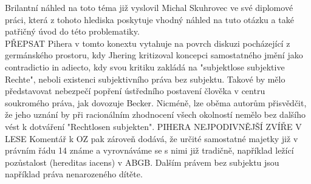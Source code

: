 \documentclass{article}
\begin{document}
Brilantní náhled na toto téma již vyslovil Michal Skuhrovec ve své diplomové práci, která z tohoto hlediska poskytuje vhodný náhled na tuto otázku a také patřičný úvod do této problematiky.\\




PŘEPSAT
Pihera v tomto konextu vytahuje na povrch diskuzi pocházející z germánského prostoru, kdy Jhering kritizoval koncepci samostatného jmění jako contradictio in adiecto, kdy svou kritiku zakládá na "subjektlose subjektive Rechte", neboli existenci subjektivního práva bez subjektu. Takové by mělo představovat nebezpečí popření ústředního postavení člověka v centru soukromého práva, jak dovozuje Becker. Nicméně, lze oběma autorům přisvědčit, že jeho uznání by při racionálním zhodnocení všech okolností nemělo bez dalšího vést k dotváření "Rechtlosen subjekten". PIHERA NEJPODIVNĚJŠÍ ZVÍŘE V LESE Komentář k OZ pak zároveň dodává, že určité samostatné majetky již v právním řádu 14 známe a vyrovnáváme se s nimi již tradičně, například ležící pozůstalost (hereditas iacens) v ABGB. Dalším právem bez subjektu jsou například práva nenarozeného dítěte.\\
\end{document}

